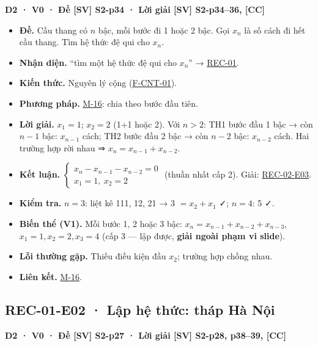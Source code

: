 \documentclass[
  10pt,
  twoside,openany]{book}
\providecommand{\tightlist}{%
  \setlength{\itemsep}{0pt}\setlength{\parskip}{0pt}}
\begin{document}
\textbf{D2 · V0 · Đề {[}SV{]} S2-p34 · Lời giải {[}SV{]} S2-p34--36,
{[}CC{]}}

\begin{itemize}
\tightlist
\item
  \textbf{Đề.} Cầu thang có \(n\) bậc, mỗi bước đi 1 hoặc 2 bậc. Gọi
  \(x_n\) là số cách đi hết cầu thang. Tìm hệ thức đệ qui cho \(x_n\).
\item
  \textbf{Nhận diện.} ``tìm một hệ thức đệ qui cho \(x_n\)'' →
  \protect\hyperlink{REC-01}{REC-01}.
\item
  \textbf{Kiến thức.} Nguyên lý cộng
  (\protect\hyperlink{F-CNT-01}{F-CNT-01}).
\item
  \textbf{Phương pháp.} \protect\hyperlink{M-16}{M-16}: chia theo bước
  đầu tiên.
\item
  \textbf{Lời giải.} \(x_1=1\); \(x_2=2\) (1+1 hoặc 2). Với \(n>2\): TH1
  bước đầu 1 bậc → còn \(n-1\) bậc: \(x_{n-1}\) cách; TH2 bước đầu 2 bậc
  → còn \(n-2\) bậc: \(x_{n-2}\) cách. Hai trường hợp rời nhau ⇒
  \(x_n=x_{n-1}+x_{n-2}\).
\item
  \textbf{Kết luận.}
  \(\begin{cases}x_n-x_{n-1}-x_{n-2}=0\\ x_1=1,\ x_2=2\end{cases}\)
  (thuần nhất cấp 2). Giải: \protect\hyperlink{REC-02-E03}{REC-02-E03}.
\item
  \textbf{Kiểm tra.} \(n=3\): liệt kê 111, 12, 21 → 3 \(=x_2+x_1\) ✓;
  \(n=4\): 5 ✓.
\item
  \textbf{Biến thể (V1).} Mỗi bước 1, 2 hoặc 3 bậc:
  \(x_n=x_{n-1}+x_{n-2}+x_{n-3}\), \(x_1=1,x_2=2,x_3=4\) (cấp 3 --- lập
  được, \textbf{giải ngoài phạm vi slide}).
\item
  \textbf{Lỗi thường gặp.} Thiếu điều kiện đầu \(x_2\); trường hợp chồng
  nhau.
\item
  \textbf{Liên kết.} \protect\hyperlink{M-16}{M-16}.
\end{itemize}

\hypertarget{REC-01-E02}{%
\subsection{REC-01-E02 · Lập hệ thức: tháp Hà Nội}\label{REC-01-E02}}

\textbf{D2 · V0 · Đề {[}SV{]} S2-p27 · Lời giải {[}SV{]} S2-p28,
p38--39, {[}CC{]}}
\end{document}
